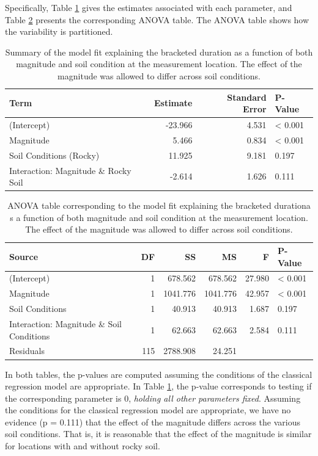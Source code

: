 \documentclass[
]{book}
\theoremstyle{plain}
\theoremstyle{mydefn}
\theoremstyle{myexmpl}
\theoremstyle{remark}
\begin{document}
Specifically, Table \ref{tab:regextensions-fit} gives the estimates associated with each parameter, and Table \ref{tab:regextensions-anova} presents the corresponding ANOVA table. The ANOVA table shows how the variability is partitioned.

\begin{table}

\caption{\label{tab:regextensions-fit}Summary of the model fit explaining the bracketed duration as a function of both magnitude and soil condition at the measurement location.  The effect of the magnitude was allowed to differ across soil conditions.}
\centering
\begin{tabular}[t]{l|r|r|l}
\hline
Term & Estimate & Standard Error & P-Value\\
\hline
(Intercept) & -23.966 & 4.531 & < 0.001\\
\hline
Magnitude & 5.466 & 0.834 & < 0.001\\
\hline
Soil Conditions (Rocky) & 11.925 & 9.181 & 0.197\\
\hline
Interaction: Magnitude \& Rocky Soil & -2.614 & 1.626 & 0.111\\
\hline
\end{tabular}
\end{table}

\begin{table}

\caption{\label{tab:regextensions-anova}ANOVA table corresponding to the model fit explaining the bracketed durationa s a function of both magnitude and soil condition at the measurement location.  The effect of the magnitude was allowed to differ across soil conditions.}
\centering
\begin{tabular}[t]{l|r|r|r|r|l}
\hline
Source & DF & SS & MS & F & P-Value\\
\hline
(Intercept) & 1 & 678.562 & 678.562 & 27.980 & < 0.001\\
\hline
Magnitude & 1 & 1041.776 & 1041.776 & 42.957 & < 0.001\\
\hline
Soil Conditions & 1 & 40.913 & 40.913 & 1.687 & 0.197\\
\hline
Interaction: Magnitude \& Soil Conditions & 1 & 62.663 & 62.663 & 2.584 & 0.111\\
\hline
Residuals & 115 & 2788.908 & 24.251 &  & \\
\hline
\end{tabular}
\end{table}

In both tables, the p-values are computed assuming the conditions of the classical regression model are appropriate. In Table \ref{tab:regextensions-fit}, the p-value corresponds to testing if the corresponding parameter is 0, \emph{holding all other parameters fixed}. Assuming the conditions for the classical regression model are appropriate, we have no evidence (p = 0.111) that the effect of the magnitude differs across the various soil conditions. That is, it is reasonable that the effect of the magnitude is similar for locations with and without rocky soil.
\end{document}
